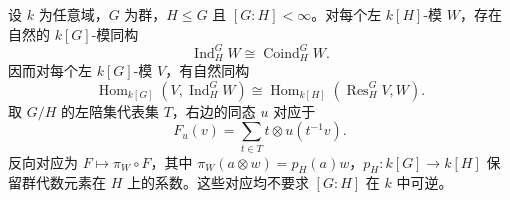 \begin{theorem}\label{b5:thm:induction-coinduction}
	设 \(k\) 为任意域，\(G\) 为群，\(H\le G\) 且 \([G:H]<\infty\)。对每个左 \(k[H]\)-模 \(W\)，存在自然的 \(k[G]\)-模同构
	\[
		\operatorname{Ind}_H^G W\cong\operatorname{Coind}_H^G W.
	\]
	因而对每个左 \(k[G]\)-模 \(V\)，有自然同构
	\begin{equation}\label{b5:eq:frobenius-right-hom}
		\operatorname{Hom}_{k[G]}(V,\operatorname{Ind}_H^G W) \cong\operatorname{Hom}_{k[H]}(\operatorname{Res}_H^G V,W).
	\end{equation}
	取 \(G/H\) 的左陪集代表集 \(T\)，右边的同态 \(u\) 对应于
	\[
		F_u(v)=\sum_{t\in T}t\otimes u(t^{-1}v).
	\]
	反向对应为 \(F\mapsto\pi_W\circ F\)，其中 \(\pi_W(a\otimes w)=p_H(a)w\)，\(p_H:k[G]\to k[H]\) 保留群代数元素在 \(H\) 上的系数。这些对应均不要求 \([G:H]\) 在 \(k\) 中可逆。
\end{theorem}
